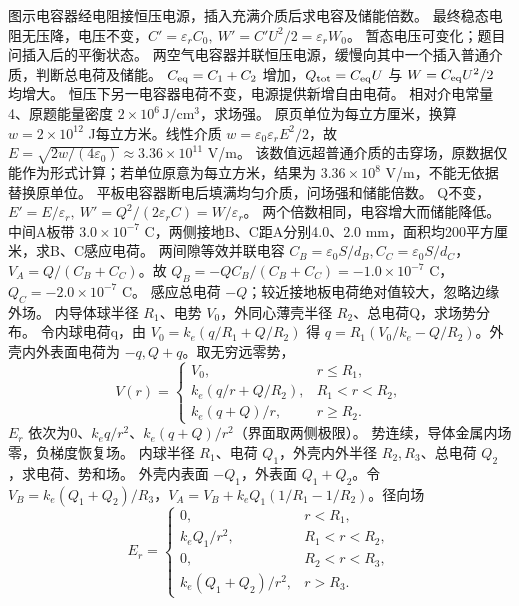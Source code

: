 \problemtext 图示电容器经电阻接恒压电源，插入充满介质后求电容及储能倍数。
\workings 最终稳态电阻无压降，电压不变，$C'=\varepsilon_r C_0,\ W'=C'U^2/2=\varepsilon_r W_0$。
\crosscheck 暂态电压可变化；题目问插入后的平衡状态。
\problemtext 两空气电容器并联恒压电源，缓慢向其中一个插入普通介质，判断总电荷及储能。
\workings $C_{\rm eq}=C_1+C_2$ 增加，$Q_{\rm tot}=C_{\rm eq}U$ 与 $W=C_{\rm eq}U^2/2$ 均增大。
\crosscheck 恒压下另一电容器电荷不变，电源提供新增自由电荷。
\problemtext 相对介电常量4、原题能量密度 $2\times10^6\,\mathrm{J/cm^3}$，求场强。
\workings 原页单位为每立方厘米，换算 $w=2\times10^{12}$ J每立方米。线性介质 $w=\varepsilon_0\varepsilon_r E^2/2$，故 $E=\sqrt{2w/(4\varepsilon_0)}\approx3.36\times10^{11}$ V/m。
\crosscheck 该数值远超普通介质的击穿场，原数据仅能作为形式计算；若单位原意为每立方米，结果为 $3.36\times10^8$ V/m，不能无依据替换原单位。
\problemtext 平板电容器断电后填满均匀介质，问场强和储能倍数。
\workings Q不变，$E'=E/\varepsilon_r,\ W'=Q^2/(2\varepsilon_r C)=W/\varepsilon_r$。
\crosscheck 两个倍数相同，电容增大而储能降低。
\problemtext 中间A板带 $3.0\times10^{-7}$ C，两侧接地B、C距A分别4.0、2.0 mm，面积均200平方厘米，求B、C感应电荷。
\workings 两间隙等效并联电容 $C_B=\varepsilon_0S/d_B,C_C=\varepsilon_0S/d_C$，$V_A=Q/(C_B+C_C)$。故 $Q_B=-Q C_B/(C_B+C_C)=-1.0\times10^{-7}$ C，$Q_C=-2.0\times10^{-7}$ C。
\crosscheck 感应总电荷 $-Q$；较近接地板电荷绝对值较大，忽略边缘外场。
\problemtext 内导体球半径 $R_1$、电势 $V_0$，外同心薄壳半径 $R_2$、总电荷Q，求场势分布。
\workings 令内球电荷q，由 $V_0=k_e(q/R_1+Q/R_2)$ 得 $q=R_1(V_0/k_e-Q/R_2)$。外壳内外表面电荷为 $-q,Q+q$。取无穷远零势，
\[
V(r)=\begin{cases}V_0,&r\le R_1,\\ k_e(q/r+Q/R_2),&R_1<r<R_2,\\ k_e(q+Q)/r,&r\ge R_2.\end{cases}
\]
$E_r$ 依次为0、$k_eq/r^2$、$k_e(q+Q)/r^2$（界面取两侧极限）。
\crosscheck 势连续，导体金属内场零，负梯度恢复场。
\problemtext 内球半径 $R_1$、电荷 $Q_1$，外壳内外半径 $R_2,R_3$、总电荷 $Q_2$，求电荷、势和场。
\workings 外壳内表面 $-Q_1$，外表面 $Q_1+Q_2$。令 $V_B=k_e(Q_1+Q_2)/R_3$，$V_A=V_B+k_eQ_1(1/R_1-1/R_2)$。径向场
\[
E_r=\begin{cases}0,&r<R_1,\\k_eQ_1/r^2,&R_1<r<R_2,\\0,&R_2<r<R_3,\\k_e(Q_1+Q_2)/r^2,&r>R_3.\end{cases}
\]
